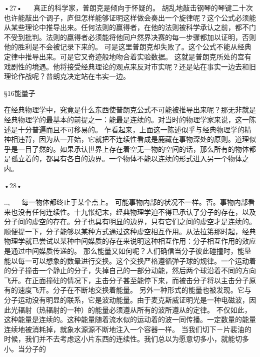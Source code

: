 •27•
  
真正的科学家，普朗克是倾向于怀疑的。
胡乱地敲击钢琴的琴键二十次也许能敲出个调子，庐但怎样能够证明这样做会奏出一个旋律呢？这个公式必须能从某些理论中推导出来。任何法则的赢得者，在他的法则被科学承认之前，都不门不受到批判。法则的嬴得者必须能将他同户然界决赛的每一步骤都加以证明，否则他的胜利是不会被记录下来的。
可是这里普朗克却失败了。这个公式不能从经典定律中推导出来。可是它又奇迹般地吻合着实验数据。
这就是普朗克所处的宫有戏剧性的境遇。他将接受经典理论的观点来反对市实呢？还是站在事实一边去和旧理论作战呢？普朗克决定站在韦实一边。

§16能量子

在经典物理学中，究竟是什么东西使普朗克公式不可能被推导出来呢？那无非就是经典物理学的最基本的前提之一：能最是连续的。对当时的物理学家来说，这一陈述是十分普遍而且不可移易的。
乍看起来，上面这一陈述似乎与经典物理学的精神相违背，因为从一开始，它就把不连续性看成是鹿藏在事物深处的原则。道理似乎是一目了然的。如果承认世界上存在着空无一物的空间的话，那么所有的物体都是孤立着的，都具有各自的边界。一个物体不能以连续的形式进入另一个物体之内。

•28•
 

..,
  
每一物体都终止于某个点上。
可能事物内部的状况不一样。否。事物内部看来也没有任何连续性。十九怅纪末，经典物理学迫不得已承认了分子的存在，以及分子间的虚空的存在。分子也具有明显的边界，只有它们之间的虚空才是连续的。
顺便提一下，分子能够以某种方式通过这种虚空相互作用。从法拉笫那时起，经典物理学就已尝试以某种中间媒质的存在来说明这种相互作用：分子相互作用的效应是通过中间媒质传递的。
那么能量又如何呢？人们确信当分子彼此碰撞时，能垦能以每一可以想象的数晕进行交换。这个交换严格遵循弹子球的规律。一个运动着的分子撞击一个静止的分子，失掉自己的一部分动能，然后两个球沿着不同的方向飞开。在正面撞砫的情况下，主击分子甚至能停下来，而被击分子将以主击分子原有的速度飞开。分子在不断地交换着能量。
另外一种形式的能量也被发现。它与分子运动没有明显的联系，它是波动能量。由于麦克斯威证明光是一种电磁波，因此光辐射（热辐射的一种）的能量必须遵从所有的波所遵从的定律。
不仅如此，这种能量是连续的。这种能量随着流水似的运动着的波一同传播。一定数量的能量连续地被消耗掉，就象水源源不断地注入一个容器一样。
当我们切下－片裴油的时候，我们并不去考虑这小片东西的连续性。我们总以为愿意切多小，就能切多小。当分子的

